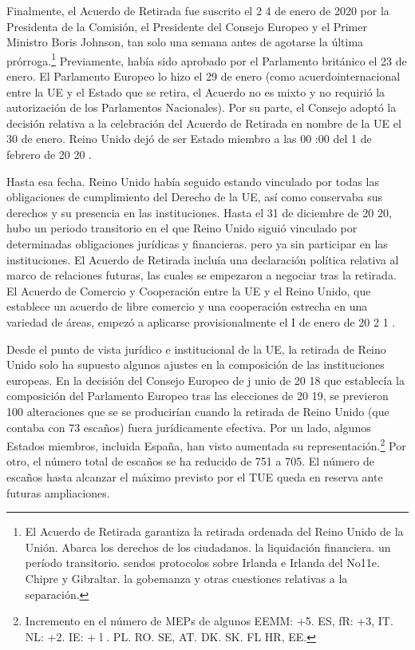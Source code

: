 \documentclass[10pt,a4paper]{article}
\begin{document}
Finalmente, el Acuerdo de Retirada fue suscrito el 2 4 de enero de 2020 por la Presidenta de la Comisión, el Presidente del Consejo Europeo y el Primer Ministro Boris Johnson, tan solo una semana antes de agotarse la última prórroga.\footnote{%
    El Acuerdo de Retirada garantiza la retirada ordenada del Reino Unido de la Unión. Abarca los derechos de los ciudadanos. la liquidación financiera. un período transitorio. sendos protocolos sobre Irlanda e Irlanda del No11e. Chipre y Gibraltar. la gobemanza y otras cuestiones relativas a la separación.
} Previamente, había sido aprobado por el Parlamento británico el 23 de enero. El Parlamento Europeo lo hizo el 29 de enero (como acuerdointernacional entre la UE y el Estado que se retira, el Acuerdo no es mixto y no requirió la autorización de los Parlamentos Nacionales). Por su parte, el Consejo adoptó la decisión relativa a la celebración del Acuerdo de Retirada en nombre de la UE el 30 de enero. Reino Unido dejó de ser Estado miembro a las 00 :00 del 1 de febrero de 20 20 .

Hasta esa fecha. Reino Unido había seguido estando vinculado por todas las obligaciones de cumplimiento del Derecho de la UE, así como conservaba sus derechos y su presencia en las instituciones. Hasta el 31 de diciembre de 20 20, hubo un periodo transitorio en el que Reino Unido siguió vinculado por determinadas obligaciones jurídicas y financieras. pero ya sin participar en las instituciones. El Acuerdo de Retirada incluía una declaración política relativa al marco de relaciones futuras, las cuales se empezaron a negociar tras la retirada. El Acuerdo de Comercio y Cooperación entre la UE y el Reino Unido, que establece un acuerdo de libre comercio y una cooperación estrecha en una variedad de áreas, empezó a aplicarse provisionalmente el I de enero de 20 2 1 .

Desde el punto de vista jurídico e institucional de la UE, la retirada de Reino Unido solo ha supuesto algunos ajustes en la composición de las instituciones europeas. En la decisión del Consejo Europeo de j unio de 20 18 que establecía la composición del Parlamento Europeo tras las elecciones de 20 19, se previeron 100 alteraciones que se se producirían cuando la retirada de Reino Unido (que contaba con 73 escaños) fuera jurídicamente efectiva. Por un lado, algunos Estados miembros, incluida España, han visto aumentada su representación.\footnote{%
    Incremento en el número de MEPs de algunos EEMM: +5. ES, fR: +3, IT. NL: +2. IE: + l . PL. RO. SE, AT. DK. SK. FL HR, EE.
} Por otro, el número total de escaños se ha reducido de 751 a 705. El número de escaños hasta alcanzar el máximo previsto por el TUE queda en reserva ante futuras ampliaciones.
\end{document}
